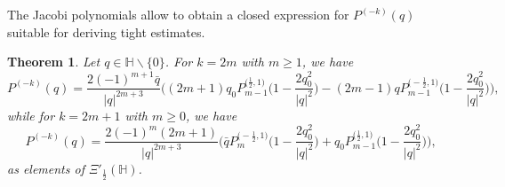 \documentclass[reqno,11pt]{amsart}
\newtheorem{theorem}{Theorem}[section]
\theoremstyle{definition}
\begin{document}
The Jacobi polynomials allow to obtain a closed expression for $P^{(-k)}(q)$ suitable for deriving tight estimates.


\begin{theorem}\label{minusk}
	Let $q \in \mathbb{H} \backslash \{0\}$. For $k=2m$ with $m \geq 1$, we have
	\begin{equation}
		\label{secondp}
		P^{(-k)}(q)=\frac{2 (-1)^{m+1}\bar{q}}{|q|^{2m+3}}\bigg((2m+1)q_0P_{m-1}^{\big(\frac{1}{2},1\big)}\bigg(1-\frac{2q_0^2}{|q|^2}\bigg)-(2m-1)qP_{m-1}^{\big(-\frac{1}{2},1\big)}\bigg(1-\frac{2q_0^2}{|q|^2}\bigg)\bigg),
	\end{equation}
	while for $k=2m+1$ with $m \geq 0$, we have
	\begin{equation}
		\label{threep}
		P^{(-k)}(q)= \frac{2 (-1)^m (2m+1)}{|q|^{2m+3}}\bigg(\bar{q}P_{m}^{\big(-\frac{1}{2},1\big)}\bigg(1-\frac{2q_0^2}{|q|^2}\bigg)+q_0P_{m-1}^{\big(\frac{1}{2},1\big)}\bigg(1-\frac{2q_0^2}{|q|^2}\bigg)\bigg),
	\end{equation}
	as elements of $\Xi'_{\frac{1}{2}}(\mathbb{H})$.
\end{theorem}
\end{document}
